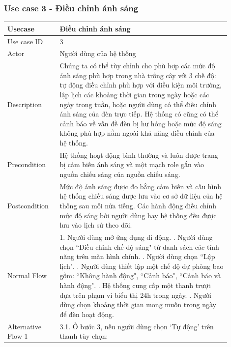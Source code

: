 \subsubsection{Use case 3 - Điều chỉnh ánh sáng}
\renewcommand{\arraystretch}{1.6}
\begin{table}[H]
\centering
\begin{tabular}{|p{0.2\linewidth}|p{0.7\linewidth}|}
\hline
\rowcolor[HTML]{EFEFEF} 
\textbf{Usecase}        & \textbf{Điều chỉnh ánh sáng} \\ \hline
Use case ID             & 3 \\ \hline
Actor                   & Người dùng của hệ thống \\ \hline
Description             & Chúng ta có thể tùy chỉnh cho phù hợp các mức độ ánh sáng phù hợp trong nhà trồng cây với 3 chế độ: tự động điều chỉnh phù hợp với điều kiện môi trường, lập lịch các khoảng thời gian trong ngày hoặc các ngày trong tuần, hoặc người dùng có thể điều chỉnh ánh sáng của đèn trực tiếp. Hệ thống có cũng có thể cảnh báo về vấn đề đèn bị hư hỏng hoặc mức độ sáng không phù hợp nằm ngoài khả năng điều chỉnh của hệ thống. \\ \hline
Precondition            & Hệ thống hoạt động bình thường và luôn được trang bị cảm biến ánh sáng và một mạch role gắn vào nguồn chiếu sáng của nguồn chiếu sáng. \\ \hline
Postcondition           & Mức độ ánh sáng được đo bằng cảm biến và cấu hình hệ thống chiếu sáng được lưu vào cơ sở dữ liệu của hệ thống sau mỗi nửa tiếng. Các hành động điều chỉnh mức độ sáng bởi người dùng hay hệ thống đều được lưu vào lịch sử theo dõi. \\ \hline
Normal Flow             & 
    1. Người dùng mở ứng dụng di động. \newline
    2. Người dùng chọn ``Điều chỉnh chế độ sáng" từ danh sách các tính năng trên màn hình chính. \newline
    3. Người dùng chọn ``Lập lịch". \newline
    4. Người dùng thiết lập một chế độ dự phòng bao gồm: ``Không hành động", ``Cảnh báo", ``Cảnh báo và hành động". \newline
    5. Hệ thống cung cấp một thanh trượt dựa trên phạm vi biểu thị 24h trong ngày. \newline
    6. Người dùng chọn khoảng thời gian mong muốn trong ngày để đèn hoạt động. 
  \\ \hline
Alternative Flow 1          & 
    3.1. Ở bước 3, nếu người dùng chọn `Tự động' trên thanh tùy chọn: \newline

\end{tabular}
\end{table}
